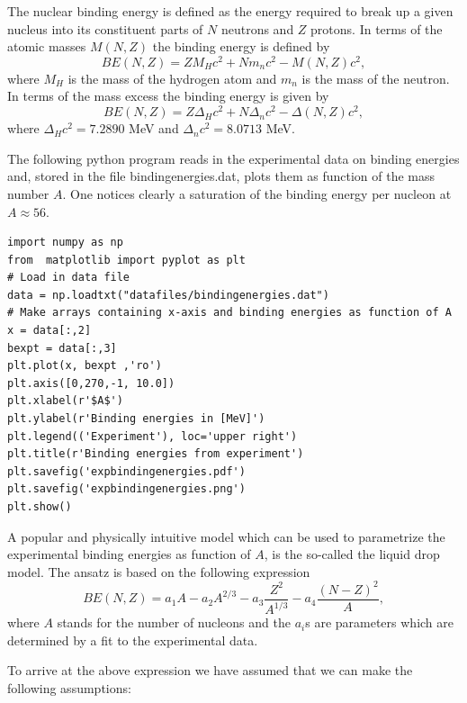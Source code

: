 \documentclass[%
oneside,                 %
final,                   %
10pt]{article}
\begin{document}
The nuclear binding energy is defined as the energy required to break up a given nucleus
into its constituent parts of $N$ neutrons and $Z$ protons. In terms of the atomic masses $M(N, Z)$ the binding energy is defined by
\[
BE(N, Z) = ZM_H c^2 + Nm_n c^2 - M(N, Z)c^2 ,
\]
where $M_H$ is the mass of the hydrogen atom and $m_n$ is the mass of the neutron.
In terms of the mass excess the binding energy is given by
\[
BE(N, Z) = Z\Delta_H c^2 + N\Delta_n c^2 -\Delta(N, Z)c^2 ,
\]
where $\Delta_H c^2 = 7.2890$ MeV and $\Delta_n c^2 = 8.0713$ MeV.


The following python program reads in the experimental data on binding energies and, stored in the file bindingenergies.dat,  plots them as function of the mass number $A$. One notices clearly a saturation of the binding energy per nucleon at $A\approx 56$.
\begin{verbatim}
import numpy as np
from  matplotlib import pyplot as plt
# Load in data file
data = np.loadtxt("datafiles/bindingenergies.dat")
# Make arrays containing x-axis and binding energies as function of A
x = data[:,2]
bexpt = data[:,3]
plt.plot(x, bexpt ,'ro')
plt.axis([0,270,-1, 10.0])
plt.xlabel(r'$A$')
plt.ylabel(r'Binding energies in [MeV]')
plt.legend(('Experiment'), loc='upper right')
plt.title(r'Binding energies from experiment')
plt.savefig('expbindingenergies.pdf')
plt.savefig('expbindingenergies.png')
plt.show()
\end{verbatim}

A popular and physically intuitive model which can be used to parametrize 
the experimental binding energies as function of $A$, is the so-called 
the liquid drop model. The ansatz is based on the following expression
\[ 
BE(N,Z) = a_1A-a_2A^{2/3}-a_3\frac{Z^2}{A^{1/3}}-a_4\frac{(N-Z)^2}{A},
\]
where $A$ stands for the number of nucleons and the $a_i$s are parameters which are determined by a fit 
to the experimental data.  

To arrive at the above expression we have assumed that we can make the following assumptions:
\end{document}
